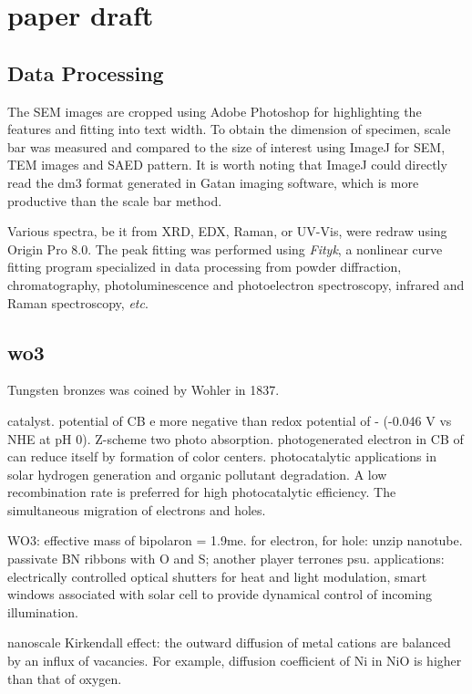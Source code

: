 \chapter{paper draft}
\section{Data Processing}

The SEM images are cropped using Adobe Photoshop for highlighting the features and fitting into text width. To obtain the dimension of specimen, scale bar was measured and compared to the size of interest using ImageJ\cite{Schneider2012} for SEM, TEM images and SAED pattern. It is worth noting that ImageJ could directly read the dm3 format generated in Gatan imaging software, which is more productive than the scale bar method.

Various spectra, be it from XRD, EDX, Raman, or UV-Vis, were redraw using Origin Pro 8.0. The peak fitting was performed using \emph{Fityk}, a nonlinear curve fitting program specialized in data processing from powder diffraction, chromatography, photoluminescence and photoelectron spectroscopy, infrared and Raman spectroscopy, \emph{etc}.\cite{Wojdyr2010}




\section{wo3}
Tungsten bronzes was coined by Wohler in 1837.\cite{Deb2008} 

 catalyst.\cite{Miyauchi2013}  potential of CB e more negative than redox potential of - (-0.046 V vs NHE at pH 0). Z-scheme two photo absorption. photogenerated electron in CB of  can reduce itself by formation of color centers.
photocatalytic applications in solar hydrogen generation and organic pollutant degradation.
A low recombination rate is preferred for high photocatalytic efficiency. The simultaneous migration of electrons and holes.

WO3: effective mass of bipolaron = 1.9me. for electron, for hole:
unzip nanotube. passivate BN ribbons with O and S; another player terrones psu.
applications: electrically controlled optical shutters for heat and light modulation, smart windows associated with solar cell to provide dynamical control of incoming illumination.

nanoscale Kirkendall effect: the outward diffusion of metal cations are balanced by an influx of vacancies. For example, diffusion coefficient of Ni in NiO is higher than that of oxygen.




